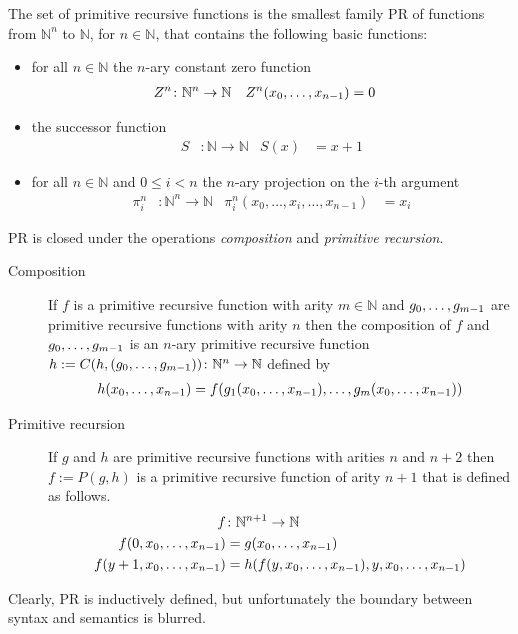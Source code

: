 \documentclass[a4paper,USenglish,cleveref, autoref, thm-restate]{lipics-v2021}
\begin{document}
The set of primitive recursive functions is the smallest family PR of functions
from ${ℕ}^n$  to ${ℕ}$, for $n\in {ℕ}$, that contains the following
basic functions:
\begin{itemize}
\item for all $n\in {ℕ}$ the $n$-ary constant zero function
  \begin{align*}
	Z^n  &\colon \mathbb{N}^n \rightarrow \mathbb{N}  &
	Z^n    ({x}_0,\dots,{x}_{n-1}) &= 0  
  \end{align*}
\item the successor function
  \begin{align*}
	S &\colon \mathbb{N} \rightarrow \mathbb{N} &
	S  (x)  &=  x + 1
  \end{align*}
\item for all $n\in {ℕ}$ and $0\le i< n$ the $n$-ary projection on
  the $i$-th argument
\begin{align*}
	\pi^{n}_{i} &\colon \mathbb{N}^n \rightarrow \mathbb{N} &
	\pi^{n}_{i}  (x_0,\dots,x_i,\dots,x_{n-1})  &= x_i
\end{align*}
\end{itemize}
PR is closed under the operations \emph{composition} and \emph{primitive recursion}.
\begin{description}
\item[Composition] 
If $f$ is a primitive recursive function with arity $m \in {ℕ}$ and
${g}_0,\dots,{g}_{m-1}$ are primitive recursive functions with arity $n$ then
the composition of $f$ and ${g}_0,\dots,{g}_{m-1}$ is an $n$-ary primitive recursive function
$h := C (h,({g}_0,\dots,{g}_{m-1})) \colon \mathbb{N}^n \rightarrow \mathbb{N} $ defined by
\begin{align*}
	h  ({x}_0,\dots,{x}_{n-1})  &= f (g_1({x}_0,\dots,{x}_{n-1}),\dots,g_m({x}_0,\dots,{x}_{n-1})) \\
\end{align*}

\item[Primitive recursion] 
If $g$ and $h$ are primitive recursive functions with arities $n$ and
$n+2$ then $f := P (g,h)$ is a primitive recursive function of arity $n+1$ that is defined as follows.
\begin{align*}
	f&\colon \mathbb{N}^{n+1} \rightarrow \mathbb{N} \\
	f  (0,{x}_0,\dots,{x}_{n-1})  &= g ({x}_0,\dots,{x}_{n-1}) \\
	f  (y + 1,{x}_0,\dots,{x}_{n-1}) &= h(  f(y,{x}_0,\dots,{x}_{n-1}),y,{x}_0,\dots,{x}_{n-1})
\end{align*}

\end{description}

Clearly, PR is inductively defined, but unfortunately the boundary
between syntax and semantics is blurred.
\end{document}
